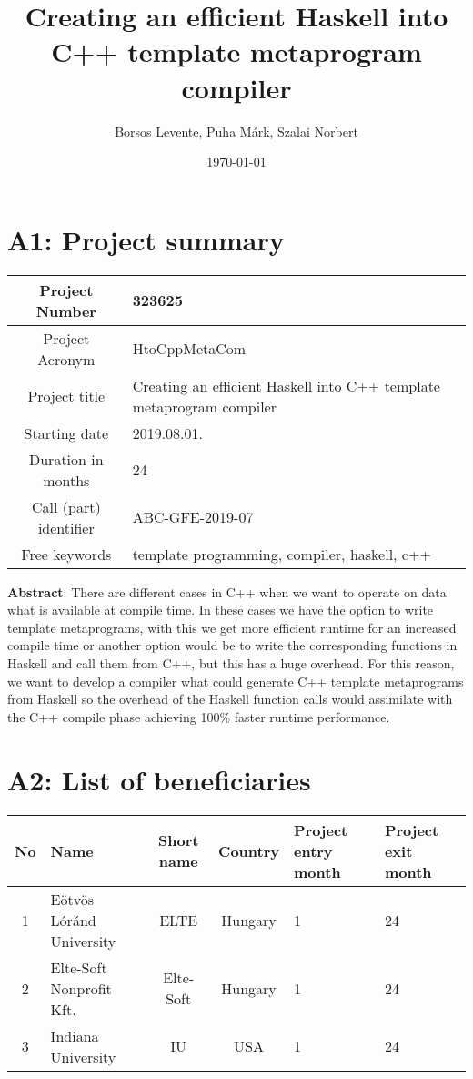 \documentclass{article}
\title{Creating an efficient Haskell into C++ template metaprogram compiler}
\date{\today}
\author{Borsos Levente, Puha Márk, Szalai Norbert}
\begin{document}
  \maketitle
  \newpage

\thispagestyle{empty}
\tableofcontents

\newpage
\thispagestyle{empty}

\section{A1: Project summary}

\begin{table}[htbp]
\centering
	\begin{tabular}{ |c|p{4cm}|  }
		\hline
		Project Number & 323625\\ \hline
		Project Acronym & HtoCppMetaCom\\ \hline
		Project title &Creating an efficient Haskell into C++ template metaprogram compiler \\ \hline
		Starting date & 2019.08.01.  \\ \hline
		Duration in months   & 24   \\ \hline
		Call (part) identifier & ABC-GFE-2019-07  \\ \hline
		Free keywords & template programming, compiler, haskell, c++  \\ \hline
	\end{tabular}
\end{table}
\textbf{Abstract}:
There are different cases in C++ when we want to operate on data what is available at compile time. In these cases we have the option to write template metaprograms, with this we get more efficient runtime for an increased compile time or another option would be to write the corresponding functions in Haskell and call them from C++, but this has a huge overhead.  For this reason, we want to develop a compiler what could generate  C++ template metaprograms from Haskell so the overhead of the Haskell function calls would assimilate with the C++ compile phase achieving 100\% faster runtime performance.
\newpage

\section{A2: List of beneficiaries}

\begin{center}
	\begin{tabular}{ |c|p{2cm}|c|c|p{1cm}|p{1cm}| }
		\hline
		No & Name & Short name & Country & Project entry month & Project exit month \\ \hline
		1 & Eötvös Lóránd University & ELTE & Hungary & 1 & 24 \\ \hline
		2 & Elte-Soft Nonprofit Kft. & Elte-Soft & Hungary & 1 & 24 \\ \hline
		3 & Indiana University & IU & USA & 1 & 24 \\ \hline
	\end{tabular}
\end{center}
\end{document}
